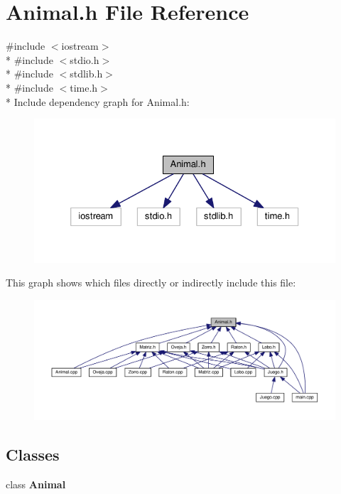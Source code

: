 \section{Animal.\-h File Reference}
\label{_animal_8h}
{\ttfamily \#include $<$iostream$>$}\\*
{\ttfamily \#include $<$stdio.\-h$>$}\\*
{\ttfamily \#include $<$stdlib.\-h$>$}\\*
{\ttfamily \#include $<$time.\-h$>$}\\*
Include dependency graph for Animal.\-h\-:
\nopagebreak
\begin{figure}[H]
\begin{center}
\leavevmode
\includegraphics[width=326pt]{_animal_8h__incl}
\end{center}
\end{figure}
This graph shows which files directly or indirectly include this file\-:
\nopagebreak
\begin{figure}[H]
\begin{center}
\leavevmode
\includegraphics[width=350pt]{_animal_8h__dep__incl}
\end{center}
\end{figure}
\subsection*{Classes}
\begin{DoxyCompactItemize}
\item 
class {\bf Animal}
\end{DoxyCompactItemize}
